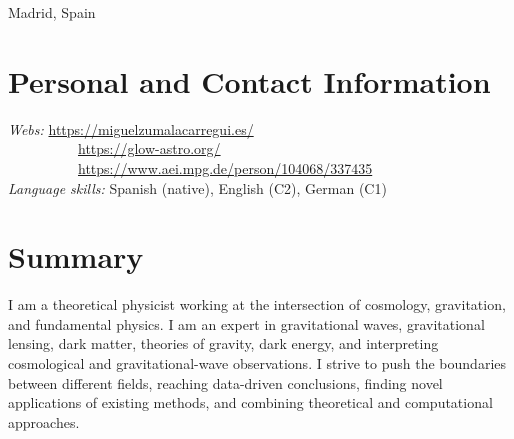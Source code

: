 \documentclass[11pt,a4paper]{article}
\begin{document}
\hspace{8.7cm} Madrid, Spain

\section*{Personal and Contact Information}
\emph{Webs:} \url{https://miguelzumalacarregui.es/} \\
${}$ ~~~~~~~~~\,\url{https://glow-astro.org/} \\
${}$ ~~~~~~~~~\,\url{https://www.aei.mpg.de/person/104068/337435}
\\
\textit{Language skills:} Spanish (native), English (C2), German (C1)
 

\section*{Summary}

I am a theoretical physicist working at the intersection of cosmology, gravitation, and fundamental physics. I am an expert in gravitational waves, gravitational lensing, dark matter, theories of gravity, dark energy, and interpreting cosmological and gravitational-wave observations. %
I strive to push the boundaries between different fields, reaching data-driven conclusions, finding novel applications of existing methods, and combining theoretical and computational approaches.


\end{document}

